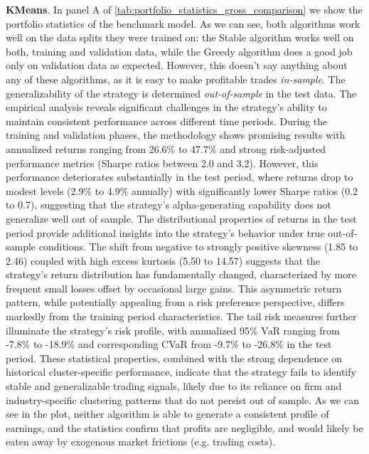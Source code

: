 \textbf{KMeans}. 
In panel A of \cref{tab:portfolio_statistics_gross_comparison} we show the portfolio statistics of the benchmark model.
As we can see, both algorithms work well on the data splits they were trained on: the Stable algorithm works well on both, training and validation data, while the Greedy algorithm does a good job only on validation data as expected. However, this doesn't say anything about any of these algorithms, as it is easy to make profitable trades \textit{in-sample}. 
%
The generalizability of the strategy is determined \textit{out-of-sample} in the test data. The empirical analysis reveals significant challenges in the strategy's ability to maintain consistent performance across different time periods. During the training and validation phases, the methodology shows promising results with annualized returns ranging from 26.6\% to 47.7\% and strong risk-adjusted performance metrics (Sharpe ratios between 2.0 and 3.2). However, this performance deteriorates substantially in the test period, where returns drop to modest levels (2.9\% to 4.9\% annually) with significantly lower Sharpe ratios (0.2 to 0.7), suggesting that the strategy's alpha-generating capability does not generalize well out of sample. The distributional properties of returns in the test period provide additional insights into the strategy's behavior under true out-of-sample conditions. The shift from negative to strongly positive skewness (1.85 to 2.46) coupled with high excess kurtosis (5.50 to 14.57) suggests that the strategy's return distribution has fundamentally changed, characterized by more frequent small losses offset by occasional large gains. This asymmetric return pattern, while potentially appealing from a risk preference perspective, differs markedly from the training period characteristics. The tail risk measures further illuminate the strategy's risk profile, with annualized 95\% VaR ranging from -7.8\% to -18.9\% and corresponding CVaR from -9.7\% to -26.8\% in the test period. These statistical properties, combined with the strong dependence on historical cluster-specific performance, indicate that the strategy fails to identify stable and generalizable trading signals, likely due to its reliance on firm and industry-specific clustering patterns that do not persist out of sample. As we can see in the plot, neither algorithm is able to generate a consistent profile of earnings, and the statistics confirm that profits are negligible, and would likely be eaten away by exogenous market frictions (e.g. trading costs).

